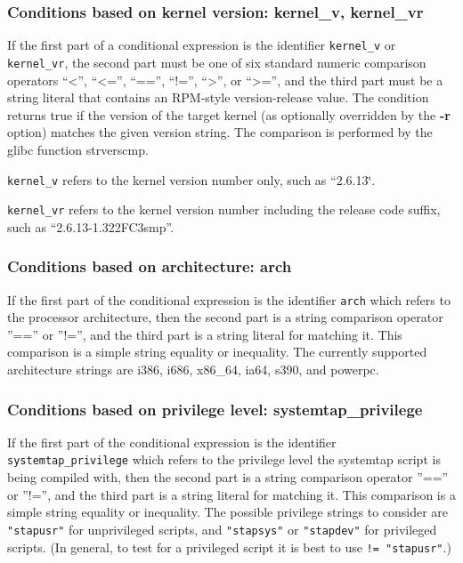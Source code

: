 \documentclass[twoside,english]{article}
\begin{document}
\subsubsection{Conditions based on kernel version: kernel\_v, kernel\_vr}
If the first part of a conditional expression is the identifier \texttt{kernel\_v}
or \texttt{kernel\_vr}, the second part must be one of six standard numeric
comparison operators {}``\textless'', {}``\textless ='', {}``=='', {}``!='', {}``\textgreater'',
or {}``\textgreater ='',
and the third part must be a string literal that contains an RPM-style version-release
value. The condition returns true if the version of the target kernel (as
optionally overridden by the \textbf{-r} option) matches the given version
string. The comparison is performed by the glibc function strverscmp.

\texttt{kernel\_v} refers to the kernel version number only, such as {}``2.6.13\char`\"{}.

\texttt{kernel\_vr} refers to the kernel version number including the release
code suffix, such as {}``2.6.13-1.322FC3smp''.


\subsubsection{Conditions based on architecture: arch}
If the first part of the conditional expression is the identifier \texttt{arch}
which refers to the processor architecture, then the second part is a string
comparison operator ''=='' or ''!='', and the third part is a string
literal for matching it. This comparison is a simple string equality or inequality.
The currently supported architecture strings are i386, i686, x86\_64, ia64,
s390, and powerpc.

\subsubsection{Conditions based on privilege level: systemtap\_privilege}

If the first part of the conditional expression is the identifier
\texttt{systemtap\_privilege} which refers to the privilege level the
systemtap script is being compiled with, then the second part is a
string comparison operator ''=='' or ''!='', and the third part is a
string literal for matching it. This comparison is a simple string
equality or inequality.  The possible privilege strings to consider
are \verb+"stapusr"+ for unprivileged scripts, and \verb+"stapsys"+ or
\verb+"stapdev"+ for privileged scripts. (In general, to test for a
privileged script it is best to use \verb+!= "stapusr"+.)
\end{document}
